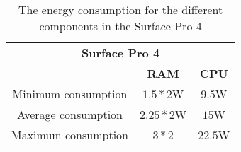 \begin{table}[ht]
    \centering
    \begin{tabular}{|| c | c | c ||}
    \hline
    \multicolumn{3}{||c||}{\textbf{Surface Pro 4}}           \\
     & \textbf{RAM}\cite{buildComputerRAM} & \textbf{CPU}\cite{IntelCPUSpec} \\ [0.5ex] \hline\hline
    Minimum consumption & $1.5 * 2$W& $9.5$W \\
    Average consumption & $2.25 * 2$W& $15$W \\
    Maximum consumption & $3 * 2$ & $22.5$W\\ \hline
    \end{tabular}
    \caption{The energy consumption for the different components in the Surface Pro 4}
    \label{tab:proQuadroEstEnergCon}    
\end{table}
